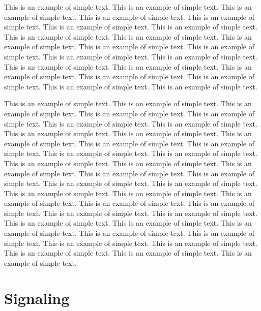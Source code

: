 \documentclass[11pt]{now}
\begin{document}
This is an example of simple text.  This
is an example of simple text. This is an example of simple text.
This is an example of simple text. This is an example of simple text.
This is an example of simple text. This is an example of simple text.
This is an example of simple text. This is an example of simple text.
This is an example of simple text. This is an example of simple text.
This is an example of simple text. This is an example of simple text.
This is an example of simple text. This is an example of simple text.
This is an example of simple text. This is an example of simple text.
This is an example of simple text. This is an example of simple text.
This is an example of simple text. This is an example of simple text.

                   This is an example of simple text. This is an
example of simple text.  This is an example of simple text. This is
an example of simple text.  This is an example of simple text. This
is an example of simple text.  This is an example of simple text.
This is an example of simple text.  This is an example of simple
text. This is an example of simple text.  This is an example of
simple text. This is an example of simple text.  This is an example
of simple text. This is an example of simple text.  This is an
example of simple text. This is an example of simple text.  This is
an example of simple text. This is an example of simple text.  This
is an example of simple text. This is an example of simple text.
This is an example of simple text. This is an example of simple text.
This is an example of simple text. This is an example of simple text.
This is an example of simple text. This is an example of simple text.
This is an example of simple text. This is an example of simple text.
This is an example of simple text. This is an example of simple text.
This is an example of simple text. This is an example of simple text.
This is an example of simple text. This is an example of simple text.
This is an example of simple text. This is an example of simple text.
This is an example of simple text. This is an example of simple text.

\section{Signaling}
\end{document}
